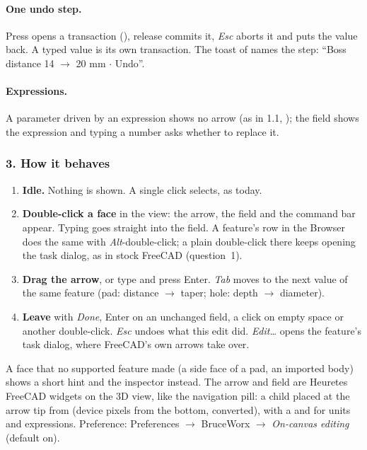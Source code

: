 \paragraph{One undo step.} Press opens a transaction (), release
commits it, \emph{Esc} aborts it and puts the value back. A typed value is its own transaction. The toast of
 names the step: ``Boss distance 14 $\rightarrow$ 20 mm $\cdot$ Undo''.

\paragraph{Expressions.} A parameter driven by an expression shows no arrow (as in 1.1, ); the
field shows the expression and typing a number asks whether to replace it.

\subsubsection*{3. How it behaves}

\begin{enumerate}[nosep]
  \item \textbf{Idle.} Nothing is shown. A single click selects, as today.
  \item \textbf{Double-click a face} in the view: the arrow, the field and the command bar appear. Typing goes
        straight into the field. A feature's row in the Browser does the same with \emph{Alt}-double-click; a plain
        double-click there keeps opening the task dialog, as in stock FreeCAD (question~1).
  \item \textbf{Drag the arrow}, or type and press Enter. \emph{Tab} moves to the next value of the same feature
        (pad: distance $\rightarrow$ taper; hole: depth $\rightarrow$ diameter).
  \item \textbf{Leave} with \emph{Done}, Enter on an unchanged field, a click on empty space or another
        double-click. \emph{Esc} undoes what this edit did. \emph{Edit\ldots} opens the feature's task dialog,
        where FreeCAD's own arrows take over.
\end{enumerate}
A face that no supported feature made (a side face of a pad, an imported body) shows a short hint and the inspector
instead. The arrow and field are Heuretes FreeCAD widgets on the 3D view, like the navigation pill: a child
 placed at the arrow tip from  (device pixels from the bottom, converted),
with a  and  for units and expressions. Preference:
Preferences $\rightarrow$ BruceWorx $\rightarrow$ \emph{On-canvas editing} (default on).

